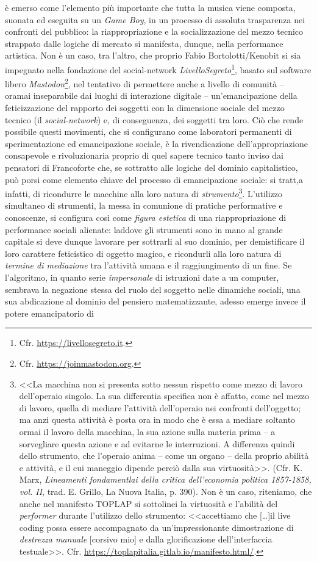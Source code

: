 \documentclass[a4paper,12pt]{scrartcl}
\newcommand{\omissis}{[\dots\unkern]}
\begin{document}
	è emerso come l'elemento più importante che tutta la musica viene composta, suonata ed eseguita su un \textit{Game Boy}, in un processo di assoluta trasparenza nei confronti del pubblico: la riappropriazione e la socializzazione del mezzo tecnico strappato dalle logiche di mercato si manifesta, dunque, nella performance artistica. Non è un caso, tra l'altro, che proprio Fabio Bortolotti/Kenobit si sia impegnato nella fondazione del social-network \textit{LivelloSegreto}\footnote{Cfr. \url{https://livellosegreto.it}.}, basato sul software libero \textit{Mastodon}\footnote{Cfr. \url{https://joinmastodon.org}.}, 
	nel tentativo di permettere anche a livello di comunità -- oramai inseparabile dai luoghi di interazione digitale -- un'emancipazione della feticizzazione del rapporto dei soggetti con la dimensione sociale del mezzo tecnico (il \textit{social-network}) e, di conseguenza, dei soggetti tra loro. Ciò che rende possibile questi movimenti, che si configurano come laboratori permanenti di sperimentazione ed emancipazione sociale, è la rivendicazione dell'appropriazione consapevole e rivoluzionaria proprio di quel sapere tecnico tanto inviso dai pensatori di Francoforte che, se sottratto alle logiche del dominio capitalistico, può porsi come elemento chiave del processo di emancipazione sociale: si tratt,a infatti, di ricondurre le macchine alla loro natura di \emph{strumento}\footnote{<<La macchina non si presenta sotto nessun rispetto come mezzo di lavoro dell'operaio singolo. La sua differentia specifica non è affatto, come nel mezzo di lavoro, quella di mediare l'attività dell'operaio nei confronti dell'oggetto; ma anzi questa attività è posta ora in modo che è essa a mediare soltanto ormai il lavoro della macchina, la sua azione sulla materia prima -- a sorvegliare questa azione e ad evitarne le interruzioni. A differenza quindi dello strumento, che l'operaio anima -- come un organo -- della proprio abilità e attività, e il cui maneggio dipende perciò dalla sua virtuosità>>. (Cfr. K. Marx, \textit{Lineamenti fondamentlai della critica dell'economia politica 1857-1858, vol. II}, trad. E. Grillo, La Nuova Italia, p. 390). Non è un caso, riteniamo, che anche nel manifesto TOPLAP si sottolinei la virtuosità e l'abilità del \emph{performer} durante l'utilizzo dello strumento: <<accettiamo che \omissis il live coding possa essere accompagnato da un'impressionante dimostrazione di \emph{destrezza manuale} [corsivo mio] e dalla glorificazione dell'interfaccia testuale>>. Cfr. \url{https://toplapitalia.gitlab.io/manifesto.html/}.}. L'utilizzo simultaneo di strumenti, la messa in comunione di pratiche performative e conoscenze, si configura così come \emph{figura estetica} di una riappropriazione di performance sociali alienate: laddove gli strumenti sono in mano al grande capitale si deve dunque lavorare per sottrarli al suo dominio, per demistificare il loro carattere feticistico di oggetto magico, e ricondurli alla loro natura di \emph{termine di mediazione} tra l'attività umana e il raggiungimento di un fine. Se l'algoritmo, in quanto serie \emph{impersonale} di istruzioni date a un computer, sembrava la negazione stessa del ruolo del soggetto nelle dinamiche sociali, una sua abdicazione al dominio del pensiero matematizzante, adesso emerge invece il potere emancipatorio di 
\end{document}
